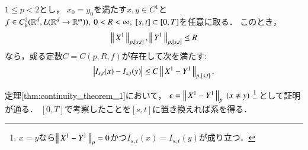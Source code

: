 	\begin{screen}
		\begin{cor}[$p$-variationによる閉球上のLipschitz連続性]\label{cor:continuity_theorem_1}
			$1 \leq p < 2$とし，
			$x_0 = y_0$を満たす$x,y \in C^1$と$f \in C^2_b(\mathbb{R}^d,L(\mathbb{R}^d \rightarrow \mathbb{R}^m)),\ 0 < R < \infty,\ [s,t] \subset [0,T]$を任意に取る．
			このとき，
			\begin{align}
				\left\|\, X^1\, \right\|_{p,[s,t]},\left\|\, Y^1\, \right\|_{p,[s,t]} \leq R
			\end{align}
			なら，或る定数$C = C(p,R,f)$が存在して次を満たす:
			\begin{align}
				\left| I_{s,t}(x) - I_{s,t}(y) \right| \leq C\left\|\, X^1 - Y^1\, \right\|_{p,[s,t]}.
			\end{align}
		\end{cor}
	\end{screen}
	
	\begin{prf}
		定理\ref{thm:continuity_theorem_1}において，
		$\epsilon = \left\|\, X^1 - Y^1\, \right\|_{p}\ (x \neq y)$
		\footnote{
			$x=y$なら$\left\|\, X^1 - Y^1\, \right\|_{p} = 0$かつ$I_{s,t}(x) = I_{s,t}(y)$が成り立つ．
		}
		として証明が通る．
		$[0,T]$で考察したことを$[s,t]$に置き換えれば系を得る．
		\QED
	\end{prf}
	
